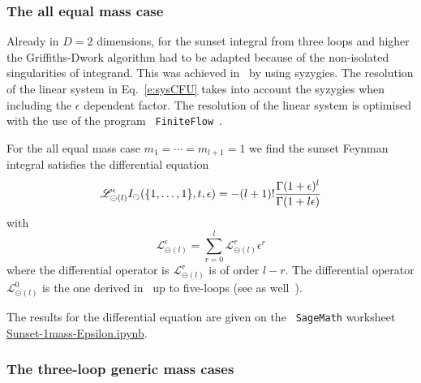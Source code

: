 \documentclass[a4paper,12pt]{article}
\numberwithin{equation}{section}
\numberwithin{figure}{section}
\def\su{\circleddash}
\begin{document}
   \subsubsection{The all equal mass case}\label{sec:highersunset1mass}
Already in $D=2$ dimensions, for the sunset integral from three loops
and higher  the Griffiths-Dwork algorithm had to be adapted because of
the non-isolated singularities of integrand. This was achieved
in~\cite{Lairez:2022zkj} by using syzygies. The resolution of the
linear system in Eq.~\eqref{e:sysCFU} takes into account the syzygies
when including the $\epsilon$ dependent factor.   The resolution of
the linear system is optimised with the use of the program {\tt
  FiniteFlow}~\cite{Peraro:2019svx}.


   
For the all equal mass case $m_1=\cdots =m_{l+1}=1$ we find the sunset
Feynman integral satisfies the differential equation
\begin{equation}
  \mathscr{L}_{\su(l)}^\epsilon I_\su(\{1,\dots,1\},t,\epsilon)=
  -(l+1)! {\Gamma(1+\epsilon)^l\over \Gamma(1+l\epsilon)}
\end{equation}
with
\begin{equation}
  \mathscr{L}_{\su(l)}^{\epsilon} =\sum_{r=0}^{l}  \mathscr{L}_{\su(l)}^{r} \epsilon^r
\end{equation}
where the differential operator is $ \mathscr{L}_{\su(l)}^{r}$ is of
order $l-r$. The differential operator $ \mathscr{L}_{\su(l)}^{0}$ is
the one derived in~\cite{Vanhove:2014wqa} up to five-loops (see as well~\cite{Bonisch:2020qmm,Pogel:2022yat,Pogel:2022ken,Pogel:2022vat}).

The results for the differential equation are given on the {\tt
  SageMath} worksheet \href{Sunset-1mass-Epsilon.ipynb}{Sunset-1mass-Epsilon.ipynb}.



\subsubsection{The three-loop generic mass cases}\label{sec:threeloop}
\end{document}
